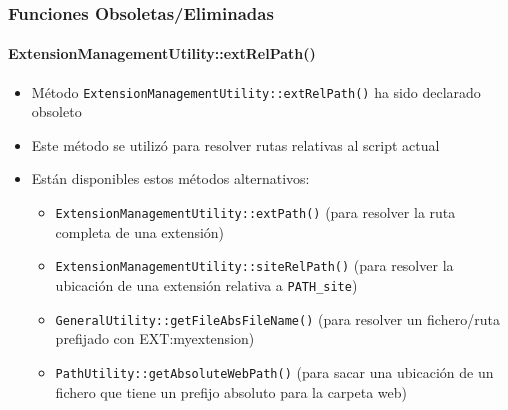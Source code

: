 \begin{frame}[fragile]
	\frametitle{Funciones Obsoletas/Eliminadas}
	\framesubtitle{ExtensionManagementUtility::extRelPath()}

	\begin{itemize}

		\item Método \texttt{ExtensionManagementUtility::extRelPath()} ha sido declarado obsoleto
		\item Este método se utilizó para resolver rutas relativas al script actual
		\item Están disponibles estos métodos alternativos:
			\begin{itemize}
				\item \texttt{ExtensionManagementUtility::extPath()}\newline
					(para resolver la ruta completa de una extensión)
				\item \texttt{ExtensionManagementUtility::siteRelPath()}\newline
					(para resolver la ubicación de una extensión relativa a \texttt{PATH\_site})
				\item \texttt{GeneralUtility::getFileAbsFileName()}\newline
					(para resolver un fichero/ruta prefijado con EXT:myextension)
				\item \texttt{PathUtility::getAbsoluteWebPath()}\newline
					(para sacar una ubicación de un fichero que tiene un prefijo absoluto para la carpeta web)
			\end{itemize}

	\end{itemize}

\end{frame}


